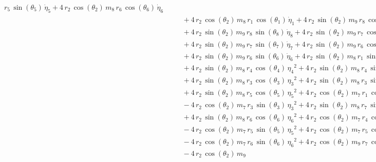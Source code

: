 \begin{eqnarray*}
\,r_{5}\,\sin({\theta_{5}})\,{\dot{\eta}_{5}} + 4\,r_{2}\,\cos({\theta
_{2}})\,m_{8}\,r_{6}\,\cos({\theta_{6}})\,{\dot{\eta}_{6}}
 \\ &&\quad\mbox{} + 4\,r_{2}\,\cos({\theta_{2}})\,m_{8}\,r_{1}\,\cos(
{\theta_{1}})\,{\dot{\eta}_{1}} + 4\,r_{2}\,\sin({\theta_{2}})\,m_{9}
\,r_{8}\,\cos({\theta_{8}})\,{{\eta_{8}}}^2 \\ &&\quad\mbox{} + 4\,r_{
2}\,\sin({\theta_{2}})\,m_{9}\,r_{8}\,\sin({\theta_{8}})\,{\dot{\eta}
_{8}} + 4\,r_{2}\,\sin({\theta_{2}})\,m_{9}\,r_{7}\,\cos({\theta_{7}})
\,{{\eta_{7}}}^2 \\ &&\quad\mbox{} + 4\,r_{2}\,\sin({\theta_{2}})\,m_{
9}\,r_{7}\,\sin({\theta_{7}})\,{\dot{\eta}_{7}} + 4\,r_{2}\,\sin({
\theta_{2}})\,m_{9}\,r_{6}\,\cos({\theta_{6}})\,{{\eta_{6}}}^2
 \\ &&\quad\mbox{} + 4\,r_{2}\,\sin({\theta_{2}})\,m_{9}\,r_{6}\,\sin(
{\theta_{6}})\,{\dot{\eta}_{6}} + 4\,r_{2}\,\sin({\theta_{2}})\,m_{8}
\,r_{1}\,\sin({\theta_{1}})\,{\dot{\eta}_{1}} \\ &&\quad\mbox{} + 4\,r
_{2}\,\sin({\theta_{2}})\,m_{8}\,r_{4}\,\cos({\theta_{4}})\,{{\eta_{4}
}}^2 + 4\,r_{2}\,\sin({\theta_{2}})\,m_{8}\,r_{4}\,\sin({\theta_{4}})
\,{\dot{\eta}_{4}} \\ &&\quad\mbox{} + 4\,r_{2}\,\sin({\theta_{2}})\,m
_{8}\,r_{3}\,\cos({\theta_{3}})\,{{\eta_{3}}}^2 + 4\,r_{2}\,\sin({
\theta_{2}})\,m_{8}\,r_{3}\,\sin({\theta_{3}})\,{\dot{\eta}_{3}}
 \\ &&\quad\mbox{} + 4\,r_{2}\,\sin({\theta_{2}})\,m_{8}\,r_{5}\,\cos(
{\theta_{5}})\,{{\eta_{5}}}^2 + 4\,r_{2}\,\cos({\theta_{2}})\,m_{7}\,r
_{1}\,\cos({\theta_{1}})\,{\dot{\eta}_{1}} \\ &&\quad\mbox{} - 4\,r_{2
}\,\cos({\theta_{2}})\,m_{7}\,r_{3}\,\sin({\theta_{3}})\,{{\eta_{3}}}^
2 + 4\,r_{2}\,\sin({\theta_{2}})\,m_{8}\,r_{7}\,\sin({\theta_{7}})\,{
\dot{\eta}_{7}} \\ &&\quad\mbox{} + 4\,r_{2}\,\sin({\theta_{2}})\,m_{8
}\,r_{6}\,\cos({\theta_{6}})\,{{\eta_{6}}}^2 + 4\,r_{2}\,\cos({\theta
_{2}})\,m_{7}\,r_{4}\,\cos({\theta_{4}})\,{\dot{\eta}_{4}}
 \\ &&\quad\mbox{} - 4\,r_{2}\,\cos({\theta_{2}})\,m_{7}\,r_{5}\,\sin(
{\theta_{5}})\,{{\eta_{5}}}^2 + 4\,r_{2}\,\cos({\theta_{2}})\,m_{7}\,r
_{5}\,\cos({\theta_{5}})\,{\dot{\eta}_{5}} \\ &&\quad\mbox{} - 4\,r_{2
}\,\cos({\theta_{2}})\,m_{7}\,r_{6}\,\sin({\theta_{6}})\,{{\eta_{6}}}^
2 + 4\,r_{2}\,\cos({\theta_{2}})\,m_{9}\,r_{7}\,\cos({\theta_{7}})\,{
\dot{\eta}_{7}} \\ &&\quad\mbox{} - 4\,r_{2}\,\cos({\theta_{2}})\,m_{9
}
\end{eqnarray*}
